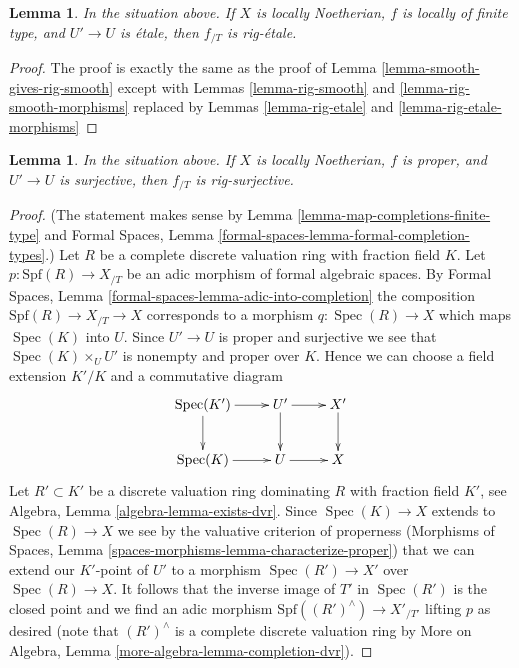 \documentclass{stacks-project}
\theoremstyle{plain}
\newtheorem{lemma}[subsection]{Lemma}
\theoremstyle{definition}
\theoremstyle{remark}
\numberwithin{equation}{subsection}
\def\Spec{\mathop{\mathrm{Spec}}}
\begin{document}
\begin{lemma}
\label{lemma-etale-gives-rig-etale}
In the situation above. If $X$ is locally Noetherian,
$f$ is locally of finite type, and $U' \to U$ is \'etale, then
$f_{/T}$ is rig-\'etale.
\end{lemma}

\begin{proof}
The proof is exactly the same as the proof of
Lemma \ref{lemma-smooth-gives-rig-smooth} except with
Lemmas \ref{lemma-rig-smooth} and \ref{lemma-rig-smooth-morphisms}
replaced by
Lemmas \ref{lemma-rig-etale} and \ref{lemma-rig-etale-morphisms}
\end{proof}

\begin{lemma}
\label{lemma-completion-proper-surjective-rig-surjective}
In the situation above. If $X$ is locally Noetherian,
$f$ is proper, and $U' \to U$ is surjective, then $f_{/T}$ is rig-surjective.
\end{lemma}

\begin{proof}
(The statement makes sense by
Lemma \ref{lemma-map-completions-finite-type} and
Formal Spaces, Lemma \ref{formal-spaces-lemma-formal-completion-types}.)
Let $R$ be a complete discrete valuation ring with fraction field $K$.
Let $p : \text{Spf}(R) \to X_{/T}$ be an adic morphism of
formal algebraic spaces. By Formal Spaces, Lemma
\ref{formal-spaces-lemma-adic-into-completion}
the composition $\text{Spf}(R) \to X_{/T} \to X$
corresponds to a morphism $q : \Spec(R) \to X$
which maps $\Spec(K)$ into $U$. Since $U' \to U$ is proper and surjective
we see that $\Spec(K) \times_U U'$ is nonempty and proper over $K$.
Hence we can choose a field extension $K'/K$ and a commutative
diagram
$$
\xymatrix{
\Spec(K') \ar[r] \ar[d] & U' \ar[r] \ar[d] & X' \ar[d] \\
\Spec(K) \ar[r] & U \ar[r] & X
}
$$
Let $R' \subset K'$ be a discrete valuation ring dominating $R$
with fraction field $K'$, see Algebra, Lemma \ref{algebra-lemma-exists-dvr}.
Since $\Spec(K) \to X$ extends to $\Spec(R) \to X$ we see by the valuative
criterion of properness
(Morphisms of Spaces, Lemma \ref{spaces-morphisms-lemma-characterize-proper})
that we can extend our $K'$-point of $U'$ to a morphism
$\Spec(R') \to X'$ over $\Spec(R) \to X$.
It follows that the inverse image of $T'$ in $\Spec(R')$ is the
closed point and we find an adic morphism
$\text{Spf}((R')^\wedge) \to X'_{/T'}$ lifting $p$
as desired (note that $(R')^\wedge$ is a complete discrete valuation ring
by More on Algebra, Lemma \ref{more-algebra-lemma-completion-dvr}).
\end{proof}
\end{document}
